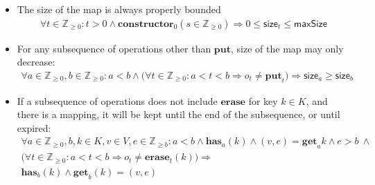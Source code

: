 \documentclass{article}
\renewcommand{\o}[1]{\ensuremath{\mathbf{#1}}}
\newcommand{\s}[1]{\ensuremath{\mathsf{#1}}}
\newcommand{\nintset}{\ensuremath{\mathds{Z}_{\ge 0}}}
\newcommand{\moreset}[1]{\ensuremath{\mathds{Z}_{\ge #1}}}
\begin{document}
\begin{itemize}
\item The size of the map is always properly bounded
  \begin{gather*}
    \forall t\in \nintset: t>0  \wedge \o{constructor}_0(s \in \nintset) \Rightarrow 0 \le \s{size}_t \le \s{maxSize}
  \end{gather*}

\item For any subsequence of operations other than \o{put}, size of the map may only decrease:
  \begin{gather*}
    \forall a\in \nintset,b\in \nintset: a<b \wedge \big(\forall t\in \nintset:a<t<b \Rightarrow o_t \neq \o{put}_t \big) \Rightarrow \s{size}_a \ge \s{size}_b
  \end{gather*}

\item If a subsequence of operations does not include \o{erase} for key $k\in K$, and there is a mapping, it will be kept until the end of the subsequence, or until expired:
  \begin{gather*}
    \forall a\in \nintset,b, k\in K, v\in V, e\in \moreset{b}: a < b \wedge \o{has}_a(k) \wedge (v, e)=\o{get}_a{k} \wedge e > b ~ \wedge\nonumber\\
    \big(\forall t\in \nintset: a<t<b \Rightarrow o_t\neq \o{erase}_t(k)\big) \Rightarrow\nonumber\\
    \o{has}_b(k) \wedge \o{get}_b(k) = (v,e)
  \end{gather*}

\end{itemize}
\end{document}
